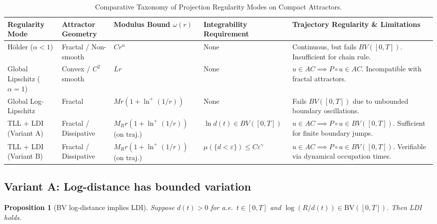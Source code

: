 \documentclass[12pt,a4paper]{article}
\theoremstyle{definition}
\theoremstyle{plain}
\newtheorem{proposition}[definition]{Proposition}
\theoremstyle{remark}
\newcommand{\BV}{\mathrm{BV}}
\begin{document}
\begin{table}[htbp]
\centering
\caption{Comparative Taxonomy of Projection Regularity Modes on Compact Attractors.}
\label{tab:regularity_taxonomy}
\vspace{0.2cm}
\footnotesize
\begin{tabularx}{\textwidth}{>{\raggedright\arraybackslash}p{2.2cm} >{\raggedright\arraybackslash}p{2.4cm} >{\raggedright\arraybackslash}p{2.2cm} >{\raggedright\arraybackslash}p{2.2cm} X}
\toprule
\textbf{Regularity Mode} & \textbf{Attractor Geometry} & \textbf{Modulus Bound $\omega(r)$} & \textbf{Integrability Requirement} & \textbf{Trajectory Regularity \& Limitations} \\
\midrule
Hölder ($\alpha < 1$) & Fractal / Non-smooth & $C r^\alpha$ & None & Continuous, but fails $BV([0,T])$. Insufficient for chain rule. \\
Global Lipschitz ($\alpha=1$) & Convex / $C^2$ smooth & $L r$ & None & $u \in AC \implies P \circ u \in AC$. Incompatible with fractal attractors. \\
Global Log-Lipschitz & Fractal & $M r (1 + \ln^+(1/r))$ & None & Fails $BV([0,T])$ due to unbounded boundary oscillations. \\
TLL + LDI (Variant A) & Fractal / Dissipative & $M_R r (1 + \ln^+(1/r))$ (on traj.) & $\ln d(t) \in BV([0,T])$ & $u \in AC \implies P \circ u \in BV([0,T])$. Sufficient for finite boundary jumps. \\
TLL + LDI (Variant B) & Fractal / Dissipative & $M_R r (1 + \ln^+(1/r))$ (on traj.) & $\mu(\{d < \varepsilon\}) \le C \varepsilon^\gamma$ & $u \in AC \implies P \circ u \in BV([0,T])$. Verifiable via dynamical occupation times. \\
\bottomrule
\end{tabularx}
\end{table}

\subsection{Variant A: Log-distance has bounded variation}

\begin{proposition}[BV log-distance implies LDI]
\label{prop:variant-A}
Suppose $d(t) > 0$ for a.e.\ $t \in [0,T]$ and
$\log(R/d(t)) \in \BV([0,T])$.  Then LDI holds.
\end{proposition}
\end{document}
